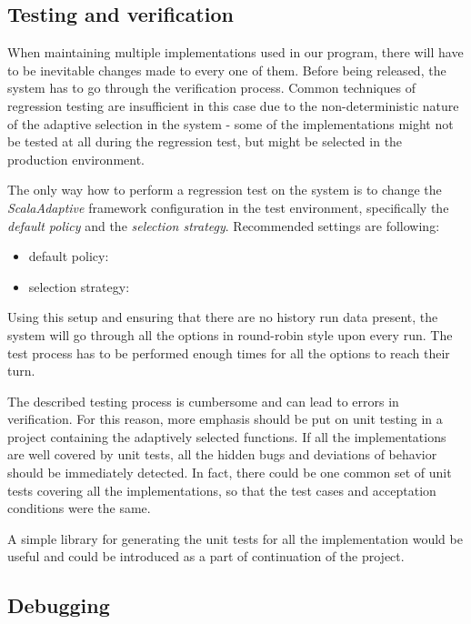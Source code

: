\subsection{Testing and verification}

When maintaining multiple implementations used in our program, there will have to be inevitable changes made to every one of them. Before being released, the system has to go through the verification process. Common techniques of regression testing are insufficient in this case due to the non-deterministic nature of the adaptive selection in the system - some of the implementations might not be tested at all during the regression test, but might be selected in the production environment.

The only way how to perform a regression test on the system is to change the \textit{ScalaAdaptive} framework configuration in the test environment, specifically the \textit{default policy} and the \textit{selection strategy}. Recommended settings are following:

 \begin{itemize}
 	\item default policy: 
 	\item selection strategy: 
 \end{itemize}

Using this setup and ensuring that there are no history run data present, the system will go through all the options in round-robin style upon every run. The test process has to be performed enough times for all the options to reach their turn.

The described testing process is cumbersome and can lead to errors in verification. For this reason, more emphasis should be put on unit testing in a project containing the adaptively selected functions. If all the implementations are well covered by unit tests, all the hidden bugs and deviations of behavior should be immediately detected. In fact, there could be one common set of unit tests covering all the implementations, so that the test cases and acceptation conditions were the same.

A simple library for generating the unit tests for all the implementation would be useful and could be introduced as a part of continuation of the project.

\subsection{Debugging}

